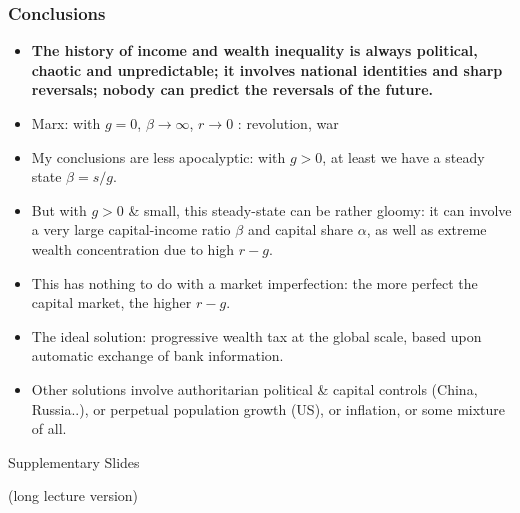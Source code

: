 \begin{frame}[label=Conclusions_1,shrink=7]
\frametitle{Conclusions}
\begin{itemize}
\item
\textbf{The history of income and wealth inequality is always political, chaotic and unpredictable; it involves national identities and sharp reversals; nobody can predict the reversals of the future.}
\item
Marx: with $g=0$, $\beta \to \infty$, $r \to 0$ : revolution, war
\item
My conclusions are less apocalyptic: with $g>0$, at least we have a steady state $\beta = s/g$.
\item
But with $g>0$ \& small, this steady-state can be rather gloomy: it can involve a very large capital-income ratio $\beta$ and capital share $\alpha$, as well as extreme wealth concentration due to high $r-g$.
\item
This has nothing to do with a market imperfection: the more perfect the capital market, the higher $r-g$.
\item
The ideal solution: progressive wealth tax at the global scale, based upon automatic exchange of bank information.
\item
Other solutions involve authoritarian political \& capital controls (China, Russia..), or perpetual population growth (US), or inflation, or some mixture of all.
\end{itemize}
\end{frame}


\begin{frame}[label=Transition_1]
\begin{center}
\begin{huge}
Supplementary Slides
\vspace{3\baselineskip}\par
(long lecture version)
\end{huge}
\end{center}
\end{frame}




